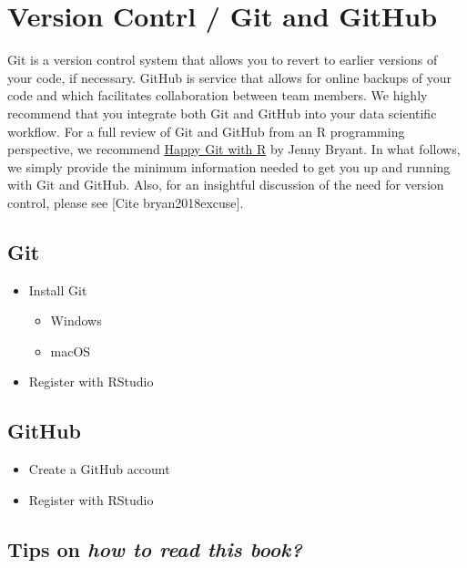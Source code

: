 \documentclass[
]{book}
\providecommand{\tightlist}{%
  \setlength{\itemsep}{0pt}\setlength{\parskip}{0pt}}
\begin{document}
\hypertarget{git-and-github}{%
\section{Version Contrl / Git and GitHub}\label{git-and-github}}

Git is a version control system that allows you to revert to earlier versions of your code, if necessary. GitHub is service that allows for online backups of your code and which facilitates collaboration between team members. We highly recommend that you integrate both Git and GitHub into your data scientific workflow. For a full review of Git and GitHub from an R programming perspective, we recommend \href{https://happygitwithr.com/}{Happy Git with R} by Jenny Bryant. In what follows, we simply provide the minimum information needed to get you up and running with Git and GitHub. Also, for an insightful discussion of the need for version control, please see {[}Cite bryan2018excuse{]}.

\hypertarget{git}{%
\subsection{Git}\label{git}}

\begin{itemize}
\tightlist
\item
  Install Git

  \begin{itemize}
  \tightlist
  \item
    Windows
  \item
    macOS
  \end{itemize}
\item
  Register with RStudio
\end{itemize}

\hypertarget{github}{%
\subsection{GitHub}\label{github}}

\begin{itemize}
\tightlist
\item
  Create a GitHub account
\item
  Register with RStudio
\end{itemize}

\hypertarget{tips-on-how-to-read-this-book}{%
\subsection{\texorpdfstring{Tips on \emph{how to read this book?}}{Tips on how to read this book?}}\label{tips-on-how-to-read-this-book}}
\end{document}
